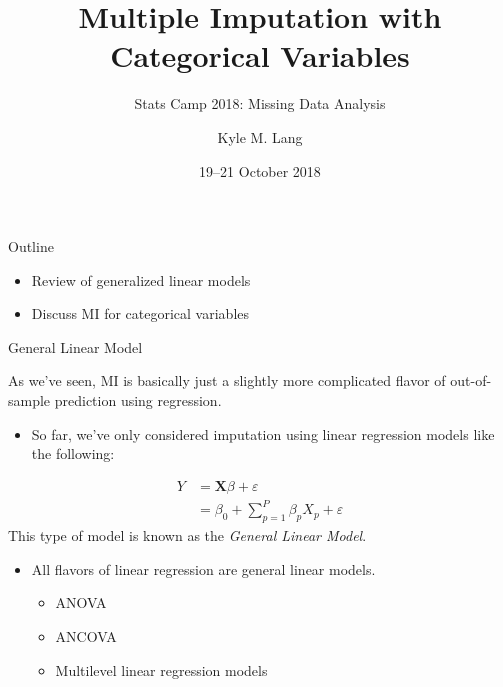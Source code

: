 \documentclass{beamer}\usepackage[]{graphicx}\usepackage[]{color}
\title{Multiple Imputation with Categorical Variables}
\subtitle{Stats Camp 2018: Missing Data Analysis}
\author{Kyle M. Lang}
\institute{Department of Methodology \& Statistics\\Tilburg University}
\date{19--21 October 2018}
\begin{document}




\begin{frame}[t,plain]
  
  \titlepage
  
\end{frame}


\begin{frame}{Outline}

  \begin{itemize}
  \item Review of generalized linear models
    \vb
  \item Discuss MI for categorical variables
  \end{itemize}

\end{frame}


\begin{frame}{General Linear Model}
  
  As we've seen, MI is basically just a slightly more complicated flavor of 
  out-of-sample prediction using regression.
  \vc
  \begin{itemize}
  \item So far, we've only considered imputation using linear regression models 
    like the following:
  \end{itemize}
  \begin{align*}
    Y &= \mathbf{X} \beta + \varepsilon\\
    &= \beta_0 + \sum_{p = 1}^P \beta_p X_p + \varepsilon
  \end{align*}
  This type of model is known as the \emph{General Linear Model}.
  \vc
  \begin{itemize}
  \item All flavors of linear regression are general linear models.
    \vc
    \begin{itemize}
    \item ANOVA
    \item ANCOVA
    \item Multilevel linear regression models
    \end{itemize}
  \end{itemize}
  
\end{frame}
\end{document}
